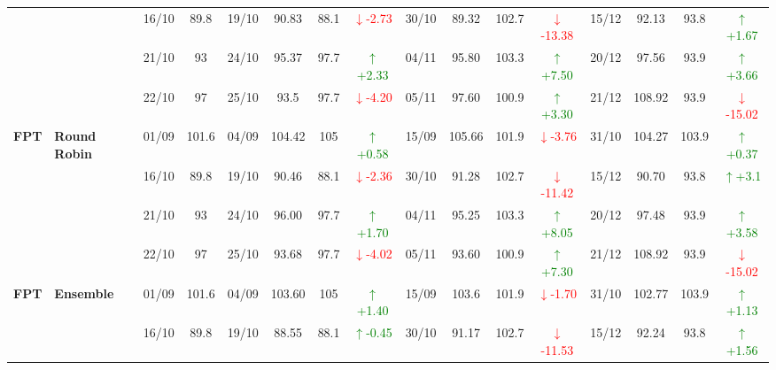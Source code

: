 \documentclass{ieeeaccess}
\begin{document}
\begin{table}[!h]
\begin{tabular}{llcc|cccc|cccc|cccc}
&
& 16/10 & 89.8 & 19/10 & 90.83 & 88.1 & \textcolor{red}{\(\downarrow\)-2.73} & 30/10 & 89.32 & 102.7 & \textcolor{red}{\(\downarrow\)-13.38} & 15/12 & 92.13 & 93.8 & \textcolor{green}{\(\uparrow\)+1.67} \\

&
& 21/10 & 93 & 24/10 & 95.37 & 97.7 & \textcolor{green}{\(\uparrow\)+2.33} & 04/11 & 95.80 & 103.3 & \textcolor{green}{\(\uparrow\)+7.50} & 20/12 & 97.56 & 93.9 &\textcolor{green}{\(\uparrow\)+3.66}\\

&
& 22/10 & 97 & 25/10 & 93.5 & 97.7 & \textcolor{red}{\(\downarrow\)-4.20} & 05/11 & 97.60 & 100.9 & \textcolor{green}{\(\uparrow\)+3.30} & 21/12 & 108.92 & 93.9 & \textcolor{red}{\(\downarrow\)-15.02} \\
\midrule


\multirow{4}{*}{\textbf{FPT}} 
& \textbf{Round Robin}
& 01/09 & 101.6 & 04/09 & 104.42 & 105 & \textcolor{green}{\(\uparrow\)+0.58} & 15/09 & 105.66 & 101.9 & \textcolor{red}{\(\downarrow\)-3.76} & 31/10 & 104.27 & 103.9 & \textcolor{green}{\(\uparrow\)+0.37} \\

&
& 16/10 & 89.8 & 19/10 & 90.46 & 88.1 & \textcolor{red}{\(\downarrow\)-2.36} & 30/10 & 91.28 & 102.7 & \textcolor{red}{\(\downarrow\)-11.42} & 15/12 & 90.70 & 93.8 & \textcolor{green}{\(\uparrow\)+3.1} \\

&
& 21/10 & 93 & 24/10 & 96.00 & 97.7 & \textcolor{green}{\(\uparrow\)+1.70} & 04/11 & 95.25 & 103.3 & \textcolor{green}{\(\uparrow\)+8.05} & 20/12 & 97.48 & 93.9 & \textcolor{green}{\(\uparrow\)+3.58} \\

&
& 22/10 & 97 & 25/10 & 93.68 & 97.7 & \textcolor{red}{\(\downarrow\)-4.02} & 05/11 & 93.60 & 100.9 & \textcolor{green}{\(\uparrow\)+7.30} & 21/12 & 108.92 & 93.9 & \textcolor{red}{\(\downarrow\)-15.02} \\
\midrule



\multirow{4}{*}{\textbf{FPT}} 
& \textbf{Ensemble}
& 01/09 & 101.6 & 04/09 & 103.60 & 105 & \textcolor{green}{\(\uparrow\)+1.40} & 15/09 & 103.6 & 101.9 & \textcolor{red}{\(\downarrow\)-1.70} & 31/10 & 102.77 & 103.9 & \textcolor{green}{\(\uparrow\)+1.13} \\

&
& 16/10 & 89.8 & 19/10 & 88.55 & 88.1 & \textcolor{green}{\(\uparrow\)-0.45} & 30/10 & 91.17 & 102.7 & \textcolor{red}{\(\downarrow\)-11.53} & 15/12 & 92.24 & 93.8 & \textcolor{green}{\(\uparrow\)+1.56} \\


\end{tabular}
\end{table}
\end{document}
